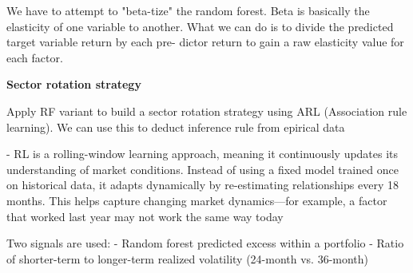 We have to attempt to "beta-tize" the random forest. Beta is basically the elasticity of one variable to another. What we can do is to divide the predicted target variable return by each pre-
dictor return to gain a raw elasticity value for each factor.

\textbf{Sector rotation strategy}

Apply RF variant to build a sector rotation strategy using ARL (Association rule learning). We can use this to deduct inference rule from epirical data

- RL is a rolling-window learning approach, meaning it continuously updates its understanding of market conditions.
Instead of using a fixed model trained once on historical data, it adapts dynamically by re-estimating relationships every 18 months.
This helps capture changing market dynamics—for example, a factor that worked last year may not work the same way today

Two signals are used:
- Random forest predicted excess within a portfolio
- Ratio of shorter-term to longer-term realized volatility (24-month vs. 36-month)